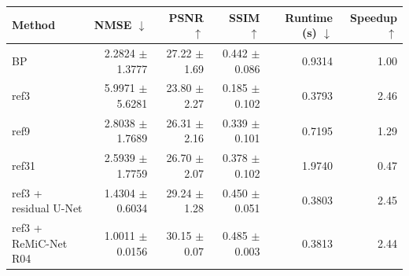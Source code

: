 \begin{tabular}{lrrrrr}
\toprule
Method & NMSE $\downarrow$ & PSNR $\uparrow$ & SSIM $\uparrow$ & Runtime (s) $\downarrow$ & Speedup $\uparrow$ \\
\midrule
BP & 2.2824 $\pm$ 1.3777 & 27.22 $\pm$ 1.69 & 0.442 $\pm$ 0.086 & 0.9314 & 1.00 \\
ref3 & 5.9971 $\pm$ 5.6281 & 23.80 $\pm$ 2.27 & 0.185 $\pm$ 0.102 & 0.3793 & 2.46 \\
ref9 & 2.8038 $\pm$ 1.7689 & 26.31 $\pm$ 2.16 & 0.339 $\pm$ 0.101 & 0.7195 & 1.29 \\
ref31 & 2.5939 $\pm$ 1.7759 & 26.70 $\pm$ 2.07 & 0.378 $\pm$ 0.102 & 1.9740 & 0.47 \\
ref3 + residual U-Net & 1.4304 $\pm$ 0.6034 & 29.24 $\pm$ 1.28 & 0.450 $\pm$ 0.051 & 0.3803 & 2.45 \\
ref3 + ReMiC-Net R04 & 1.0011 $\pm$ 0.0156 & 30.15 $\pm$ 0.07 & 0.485 $\pm$ 0.003 & 0.3813 & 2.44 \\
\bottomrule
\end{tabular}
